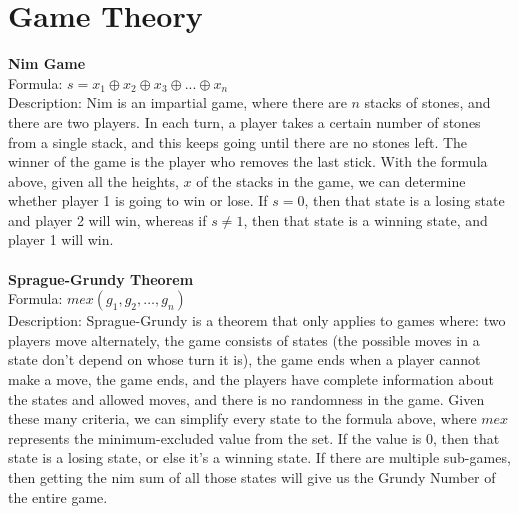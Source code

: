 \documentclass[12pt]{report}
\begin{document}
\section{Game Theory}
\textbf{Nim Game}\\
Formula: \(s=x_1\oplus{x_2}\oplus{x_3}\oplus...\oplus{x_n}\)\\
Description: Nim is an impartial game, where there are \(n\) stacks of stones, and there are two players. In each turn, a player takes a certain number of stones from a single stack, and this keeps going until there are no stones left. The winner of the game is the player who removes the last stick. With the formula above, given all the heights, \(x\) of the stacks in the game, we can determine whether player 1 is going to win or lose. If \(s=0\), then that state is a losing state and player 2 will win, whereas if \(s\neq{1}\), then that state is a winning state, and player 1 will win.\\\\
\textbf{Sprague-Grundy Theorem}\\
Formula: \(mex({g_1,g_2,\dots,g_n})\)\\
Description: Sprague-Grundy is a theorem that only applies to games where: two players move alternately, the game consists of states (the possible moves in a state don't depend on whose turn it is), the game ends when a player cannot make a move, the game ends, and the players have complete information about the states and allowed moves, and there is no randomness in the game. Given these many criteria, we can simplify every state to the formula above, where \(mex\) represents the minimum-excluded value from the set. If the value is \(0\), then that state is a losing state, or else it's a winning state. If there are multiple sub-games, then getting the nim sum of all those states will give us the Grundy Number of the entire game.\\
\end{document}
